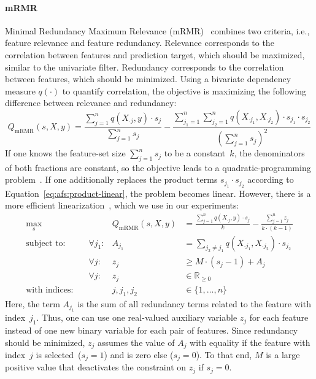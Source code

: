 \documentclass{article}
\theoremstyle{definition}
\begin{document}
\paragraph{mRMR}

Minimal Redundancy Maximum Relevance (mRMR)~\cite{peng2005feature} combines two criteria, i.e., feature relevance and feature redundancy.
Relevance corresponds to the correlation between features and prediction target, which should be maximized, similar to the univariate filter.
Redundancy corresponds to the correlation between features, which should be minimized.
Using a bivariate dependency measure $q(\cdot)$ to quantify correlation, the objective is maximizing the following difference between relevance and redundancy:
%
\begin{equation}
	Q_{\text{mRMR}}(s,X,y) = \frac{\sum_{j=1}^{n} q(X_{\cdot{}j},y) \cdot s_j}{\sum_{j=1}^{n} s_j} - \frac{\sum_{j_1=1}^{n} \sum_{j_2=1}^{n} q(X_{\cdot{}j_1}, X_{\cdot{}j_2}) \cdot s_{j_1} \cdot s_{j_2}}{(\sum_{j=1}^{n} s_j)^2}
	\label{eq:afs:mrmr}
\end{equation}
%
If one knows the feature-set size $\sum_{j=1}^{n} s_j$ to be a constant~$k$, the denominators of both fractions are constant, so the objective leads to a quadratic-programming problem~\cite{nguyen2014effective, rodriguez2010quadratic}.
If one additionally replaces the product terms $s_{j_1} \cdot s_{j_2}$ according to Equation~\ref{eq:afs:product-linear}, the problem becomes linear.
However, there is a more efficient linearization~\cite{nguyen2009optimizing, nguyen2010towards}, which we use in our experiments:
%
\begin{equation}
	\begin{aligned}
		\max_s &\quad & Q_{\text{mRMR}}(s,X,y) &= \frac{\sum_{j=1}^{n} q(X_{\cdot{}j},y) \cdot s_j}{k} - \frac{\sum_{j=1}^{n} z_j}{k \cdot (k-1)} \\
		\text{subject to:} &\quad \forall j_1: & A_{j_1} &= \sum_{j_2 \neq j_1} q(X_{\cdot{}j_1}, X_{\cdot{}j_2}) \cdot s_{j_2} \\
		&\quad \forall j: & z_j &\geq M \cdot (s_j - 1) + A_j \\
		&\quad \forall j: & z_j &\in \mathbb{R}_{\geq 0} \\
		\text{with indices:} &\quad & j, j_1, j_2 &\in \{1, \dots, n\}
	\end{aligned}
	\label{eq:afs:mrmr-linear}
\end{equation}
%
Here, the term $A_{j_1}$ is the sum of all redundancy terms related to the feature with index~$j_1$.
Thus, one can use one real-valued auxiliary variable $z_j$ for each feature instead of one new binary variable for each pair of features.
Since redundancy should be minimized, $z_j$ assumes the value of $A_j$ with equality if the feature with index~$j$ is selected~($s_j=1$) and is zero else ($s_j=0$).
To that end, $M$ is a large positive value that deactivates the constraint on $z_j$ if $s_j=0$.
\end{document}
